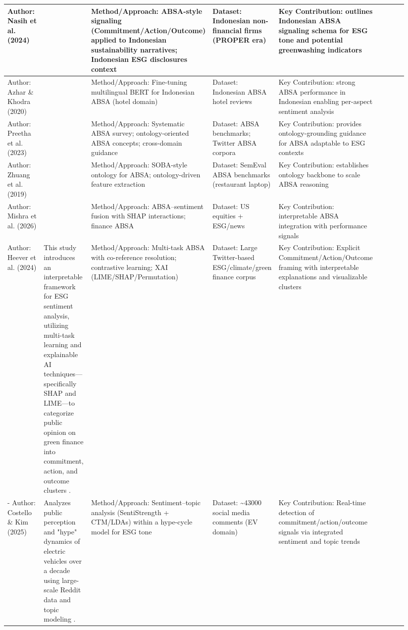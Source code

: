 \documentclass{article}
\begin{document}
\begin{landscape}
\begin{longtable}{p{0.134\linewidth} p{0.134\linewidth} p{0.134\linewidth} p{0.134\linewidth} p{0.134\linewidth} p{0.134\linewidth} p{0.134\linewidth}}
Author: Nasih et al. (2024) & ~ & Method/Approach: ABSA-style signaling (Commitment/Action/Outcome) applied to Indonesian sustainability narratives; Indonesian ESG disclosures context & Dataset: Indonesian non-financial firms (PROPER era) & Key Contribution: outlines Indonesian ABSA signaling schema for ESG tone and potential greenwashing indicators & ~ \\ \hline
Author: Azhar \& Khodra (2020) & ~ & Method/Approach: Fine-tuning multilingual BERT for Indonesian ABSA (hotel domain) & Dataset: Indonesian ABSA hotel reviews & Key Contribution: strong ABSA performance in Indonesian enabling per-aspect sentiment analysis & ~ \\ \hline
Author: Preetha et al. (2023) & ~ & Method/Approach: Systematic ABSA survey; ontology-oriented ABSA concepts; cross-domain guidance & Dataset: ABSA benchmarks; Twitter ABSA corpora & Key Contribution: provides ontology-grounding guidance for ABSA adaptable to ESG contexts & ~ \\ \hline
Author: Zhuang et al. (2019) & ~ & Method/Approach: SOBA-style ontology for ABSA; ontology-driven feature extraction & Dataset: SemEval ABSA benchmarks (restaurant laptop) & Key Contribution: establishes ontology backbone to scale ABSA reasoning & ~ \\ \hline
Author: Mishra et al. (2026) & ~ & Method/Approach: ABSA–sentiment fusion with SHAP interactions; finance ABSA & Dataset: US equities + ESG/news & Key Contribution: interpretable ABSA integration with performance signals & ~ \\ \hline
Author: Heever et al. (2024) & This study introduces an interpretable framework for ESG sentiment analysis, utilizing multi-task learning and explainable AI techniques—specifically SHAP and LIME—to categorize public opinion on green finance into commitment, action, and outcome clusters  \parencite{wihan_van_der_heever_44c76c99}. & Method/Approach: Multi-task ABSA with co-reference resolution; contrastive learning; XAI (LIME/SHAP/Permutation) & Dataset: Large Twitter-based ESG/climate/green finance corpus & Key Contribution: Explicit Commitment/Action/Outcome framing with interpretable explanations and visualizable clusters & ~ \\ \hline
- Author: Costello \& Kim (2025) & Analyzes public perception and "hype" dynamics of electric vehicles over a decade using large-scale Reddit data and topic modeling  \parencite{tao_ruan_824a9480}. & Method/Approach: Sentiment–topic analysis (SentiStrength + CTM/LDAs) within a hype-cycle model for ESG tone & Dataset: \textasciitilde{}43000 social media comments (EV domain) & Key Contribution: Real-time detection of commitment/action/outcome signals via integrated sentiment and topic trends & ~ \\ \hline

\end{longtable}
\end{landscape}
\end{document}
